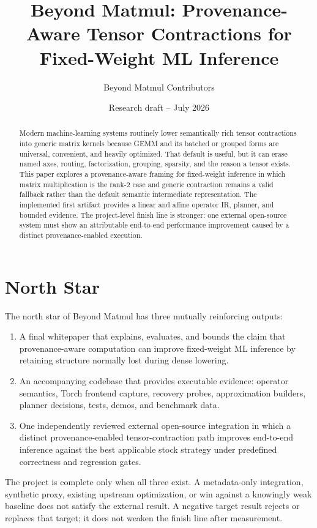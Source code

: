 \documentclass[11pt]{article}
\title{Beyond Matmul: Provenance-Aware Tensor Contractions for Fixed-Weight ML Inference}
\author{Beyond Matmul Contributors}
\date{Research draft -- July 2026}
\begin{document}
\maketitle

\begin{abstract}
Modern machine-learning systems routinely lower semantically rich tensor
contractions into generic matrix kernels because GEMM and its batched or grouped
forms are universal, convenient, and heavily optimized. That default is useful,
but it can erase named axes, routing, factorization, grouping, sparsity, and the
reason a tensor exists. This paper explores a provenance-aware framing for
fixed-weight inference in which matrix multiplication is the rank-2 case and
generic contraction remains a valid fallback rather than the default semantic
intermediate representation. The implemented first artifact provides a linear
and affine operator IR, planner, and bounded evidence. The project-level finish
line is stronger: one external open-source system must show an attributable
end-to-end performance improvement caused by a distinct provenance-enabled
execution.
\end{abstract}

\section{North Star}

The north star of Beyond Matmul has three mutually reinforcing outputs:

\begin{enumerate}
  \item A final whitepaper that explains, evaluates, and bounds the claim that
  provenance-aware computation can improve fixed-weight ML inference by
  retaining structure normally lost during dense lowering.
  \item An accompanying codebase that provides executable evidence: operator
  semantics, Torch frontend capture, recovery probes, approximation builders,
  planner decisions, tests, demos, and benchmark data.
  \item One independently reviewed external open-source integration in which a
  distinct provenance-enabled tensor-contraction path improves end-to-end
  inference against the best applicable stock strategy under predefined
  correctness and regression gates.
\end{enumerate}

The project is complete only when all three exist. A metadata-only integration,
synthetic proxy, existing upstream optimization, or win against a knowingly
weak baseline does not satisfy the external result. A negative target result
rejects or replaces that target; it does not weaken the finish line after
measurement.
\end{document}
